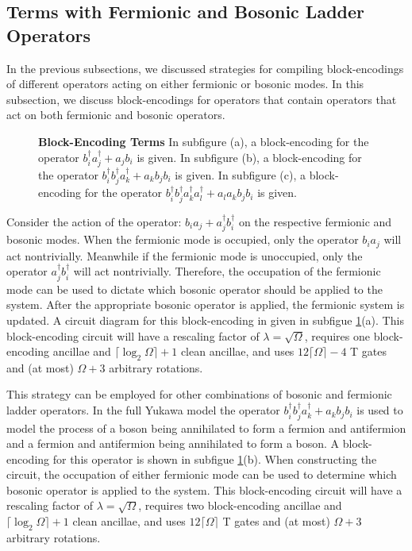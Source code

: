 \subsection{Terms with Fermionic and Bosonic Ladder Operators}

In the previous subsections, we discussed strategies for compiling block-encodings of different operators acting on either fermionic or bosonic modes.
In this subsection, we discuss block-encodings for operators that contain operators that act on both fermionic and bosonic operators.

\begin{figure}
    
    
    
    \caption{
        \textbf{Block-Encoding Terms}
        In subfigure (a), a block-encoding for the operator $b_i^\dagger a_j^\dagger + a_j b_i$ is given.
        In subfigure (b), a block-encoding for the operator $ b_i^\dagger b_j^\dagger a_k^\dagger + a_k b_j b_i$ is given.
        In subfigure (c), a block-encoding for the operator $b_i^\dagger b_j^\dagger a_k^\dagger a_l^\dagger + a_l a_k b_j b_i$ is given.
    }
    \label{fig:be-term-example}
\end{figure}


Consider the action of the operator: $b_i a_j + a_j^\dagger b_i^\dagger$ on the respective fermionic and bosonic modes.
When the fermionic mode is occupied, only the operator $b_i a_j$ will act nontrivially.
Meanwhile if the fermionic mode is unoccupied, only the operator $a_j^\dagger b_i^\dagger$ will act nontrivially.
Therefore, the occupation of the fermionic mode can be used to dictate which bosonic operator should be applied to the system.
After the appropriate bosonic operator is applied, the fermionic system is updated.
A circuit diagram for this block-encoding in given in subfigue \ref{fig:be-term-example}(a).
This block-encoding circuit will have a rescaling factor of $\lambda = \sqrt{\Omega}$, requires one block-encoding ancillae and $\lceil \log_2\Omega \rceil + 1$ clean ancillae, and uses $12 \lceil \Omega \rceil - 4$ T gates and (at most) $\Omega + 3$ arbitrary rotations.

This strategy can be employed for other combinations of bosonic and fermionic ladder operators.
In the full Yukawa model the operator $b_i^\dagger b_j^\dagger a_k^\dagger + a_k b_j b_i$ is used to model the process of a boson being annihilated to form a fermion and antifermion and a fermion and antifermion being annihilated to form a boson.
A block-encoding for this operator is shown in subfigue \ref{fig:be-term-example}(b).
When constructing the circuit, the occupation of either fermionic mode can be used to determine which bosonic operator is applied to the system.
This block-encoding circuit will have a rescaling factor of $\lambda = \sqrt{\Omega}$, requires two block-encoding ancillae and $\lceil \log_2\Omega \rceil + 1$ clean ancillae, and uses $12 \lceil \Omega \rceil$ T gates and (at most) $\Omega + 3$ arbitrary rotations.

